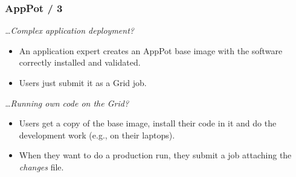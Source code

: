 \documentclass[english,serif,mathserif,xcolor=pdftex,dvipsnames,table]{beamer}
\begin{document}
\begin{frame}
  \frametitle{AppPot / 3}
  
  \emph{\ldots Complex application deployment?}
  \begin{itemize}
  \item An application expert creates an AppPot base image with the
    software correctly installed and validated.
  \item Users just submit it as a Grid job.
  \end{itemize}

  \+
  \emph{\ldots Running own code on the Grid?}
  \begin{itemize}
  \item  Users get a copy of the base image, install their code in it and do
    the development work (e.g., on their laptops).
  \item  When they want to do a production run, they submit a job attaching the \emph{changes} file.
  \end{itemize}

  \+
  \begin{flushright}
    \hyperlink{smscg2}{}
  \end{flushright}
\end{frame}
\end{document}
